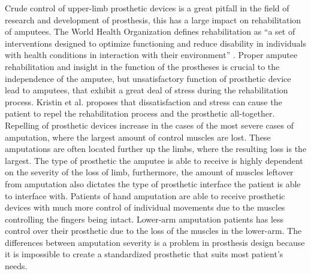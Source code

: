 \documentclass[../main.tex]{subfiles}
\begin{document}
Crude control of upper-limb prosthetic devices is a great pitfall in the field of research and development of prosthesis, this has a large impact on rehabilitation of amputees.
The World Health Organization defines rehabilitation as ``a set of interventions designed to optimize functioning and reduce disability in individuals with health conditions in interaction with their environment'' \cite{WHO_rehab}.
Proper amputee rehabilitation and insight in the function of the prostheses is crucial to the independence of the amputee, but unsatisfactory function of prosthetic device lead to amputees, that exhibit a great deal of stress during the rehabilitation process.
Kristin et al. \cite{Kristin2012} proposes that dissatisfaction and stress can cause the patient to repel the rehabilitation process and the prosthetic all-together.
Repelling of prosthetic devices increase in the cases of the most severe cases of amputation, where the largest amount of control muscles are lost.
These amputations are often located further up the limbs, where the resulting loss is the largest.
The type of prosthetic the amputee is able to receive is highly dependent on the severity of the loss of limb, furthermore, the amount of muscles leftover from amputation also dictates the type of prosthetic interface the patient is able to interface with.
Patients of hand amputation are able to receive prosthetic devices with much more control of individual movements due to the muscles controlling the fingers being intact. 
Lower-arm amputation patients has less control over their prosthetic due to the loss of the muscles in the lower-arm.
The differences between amputation severity is a problem in prosthesis design because it is impossible to create a standardized prosthetic that suits most patient's needs.


\end{document}
